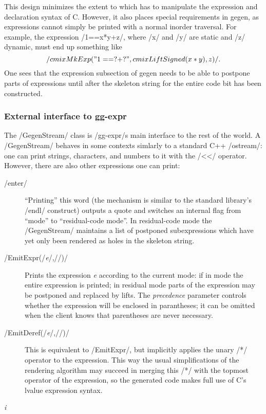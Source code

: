 \begin{docpart}
This design minimizes the extent to which \Pgen has to manipulate
the expression and declaration syntax of C. However, it also places
special requirements in gegen, as expressions cannot simply
be printed with a normal inorder traversal. For example, the
expression /1==x*y+z/, where /x/ and /y/ are static and /z/ dynamic,
must end up something like
$$/cmixMkExp("1==?+?",cmixLiftSigned(x*y),z)/.$$
One sees that the expression subsection of gegen needs to be able
to postpone parts of expressions until after the skeleton string
for the entire code bit has been constructed.

\subsubsection{External interface to gg-expr}

The /GegenStream/ class is /gg-expr/s main interface to the rest of
the world. A /GegenStream/ behaves in some contexts simlarly to
a standard C++ /ostream/: one can print strings, characters, and
numbers to it with the /<</ operator. However, there are also other
expressions one can print:
\begin{description}
\item[/enter/] ``Printing'' this word (the mechanism is similar to
  the standard library's /endl/ construct) outputs a quote and
  switches an internal flag from ``\Pgen mode'' to ``residual-code
  mode''. In residual-code mode the /GegenStream/ maintains a
  list of postponed subexpressions which have yet only been rendered
  as holes in the skeleton string.
\item[/EmitExpr(/\textit{\mdseries e}/,/\textit{}/)/]
  Prints the \coreC expression \textit{e} according to the current
  mode: if in \Pgen mode the entire expression is printed; in
  residual mode parts of the expression may be postponed and replaced
  by lifts. The \textit{precedence} parameter controls whether the
  expression will be enclosed in parantheses; it can be omitted when
  the client knows that parentheses are never necessary.
\item[/EmitDeref(/\textit{\mdseries e}/,/\textit{}/)/]
  This is equivalent to /EmitExpr/, but implicitly applies the unary
  /*/ operator to the expression. This way the usual simplifications
  of the \coreC rendering algorithm may succeed in merging this
  /*/ with the topmost operator of the expression, so the generated
  code makes full use of C's lvalue expression syntax.
\item[\textit{\mdseries i}]

\end{description}
\end{docpart}
